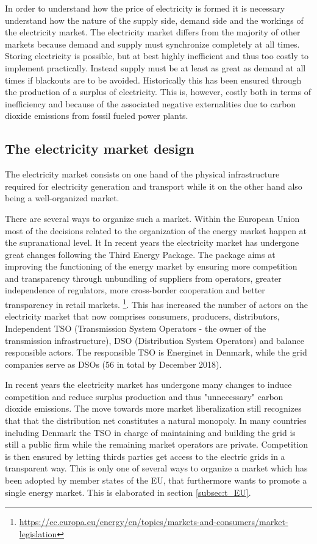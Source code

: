 \label{sec:theory}
In order to understand how the price of electricity is formed it is necessary understand how the nature of the supply side, demand side and the workings of the electricity market. The electricity market differs from the majority of other markets because demand and supply must synchronize completely at all times. Storing electricity is possible, but at best highly inefficient and thus too costly to implement practically. Instead supply must be at least as great as demand at all times if blackouts are to be avoided. Historically this has been ensured through the production of a surplus of electricity. This is, however, costly both in terms of inefficiency and because of the associated negative externalities due to carbon dioxide emissions from fossil fueled power plants.


\subsection{The electricity market design}
\label{subsec:t_market}
The electricity market consists on one hand of the physical infrastructure required for electricity generation and transport while it on the other hand also being a well-organized market. \bigskip \par
There are several ways to organize such a market. Within the European Union most of the decisions related to the organization of the energy market happen at the supranational level. It In recent years the electricity market has undergone great changes following the Third Energy Package. The package aims at improving the functioning of the energy market by ensuring more competition and transparency through unbundling of suppliers from operators, greater independence of regulators, more cross-border cooperation and better transparency in retail markets. \footnote{\url{https://ec.europa.eu/energy/en/topics/markets-and-consumers/market-legislation}}. This has increased the number of actors on the electricity market that now comprises consumers, producers, distributors, Independent TSO (Transmission System Operators - the owner of the transmission infrastructure), DSO (Distribution System Operators) and balance responsible actors. The responsible TSO is Energinet in Denmark, while the grid companies serve as DSOs (56 in total by December 2018).
\bigskip \par
In recent years the electricity market has undergone many changes to induce competition and reduce surplus production and thus "unnecessary" carbon dioxide emissions. The move towards more market liberalization still recognizes that that the distribution net constitutes a natural monopoly. In many countries including Denmark the TSO in charge of maintaining and building the grid is still a public firm while the remaining market operators are private. Competition is then ensured by letting thirds parties get access to the electric grids in a transparent way. This is only one of several ways to organize a market which has been adopted by member states of the EU, that furthermore wants to promote a single energy market. This is elaborated in section \ref{subsec:t_EU}.
\par

